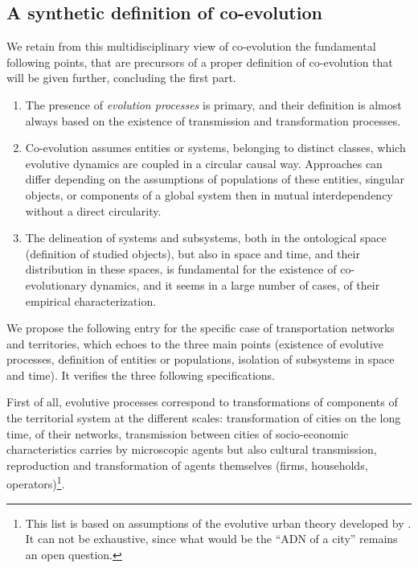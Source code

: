 \documentclass[letterpaper]{article}
\begin{document}
\subsection{A synthetic definition of co-evolution}




We retain from this multidisciplinary view of co-evolution the fundamental following points, that are precursors of a proper definition of co-evolution that will be given further, concluding the first part.

\begin{enumerate}
	\item The presence of \emph{evolution processes} is primary, and their definition is almost always based on the existence of transmission and transformation processes.
	\item Co-evolution assumes entities or systems, belonging to distinct classes, which evolutive dynamics are coupled in a circular causal way. Approaches can differ depending on the assumptions of populations of these entities, singular objects, or components of a global system then in mutual interdependency without a direct circularity.
	\item The delineation of systems and subsystems, both in the ontological space (definition of studied objects), but also in space and time, and their distribution in these spaces, is fundamental for the existence of co-evolutionary dynamics, and it seems in a large number of cases, of their empirical characterization.
\end{enumerate}






We propose the following entry for the specific case of transportation networks and territories, which echoes to the three main points (existence of evolutive processes, definition of entities or populations, isolation of subsystems in space and time). It verifies the three following specifications.


First of all, evolutive processes correspond to transformations of components of the territorial system at the different scales: transformation of cities on the long time, of their networks, transmission between cities of socio-economic characteristics carries by microscopic agents but also cultural transmission, reproduction and transformation of agents themselves (firms, households, operators)\footnote{This list is based on assumptions of the evolutive urban theory developed by \cite{pumain2008socio}. It can not be exhaustive, since what would be the ``ADN of a city'' remains an open question.}.
\end{document}
